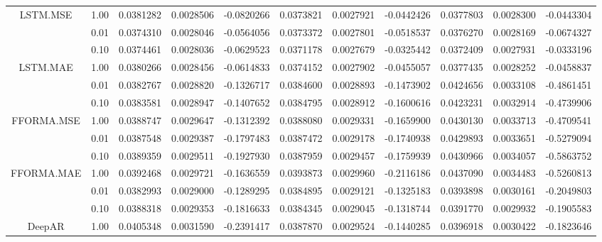 \begin{longtable}[t]{ccccccccccc}
\cmidrule{2-11}
\multirow{-3}{*}{\centering\arraybackslash LSTM.MSE} & 1.00 & 0.0381282 & 0.0028506 & -0.0820266 & 0.0373821 & 0.0027921 & -0.0442426 & 0.0377803 & 0.0028300 & -0.0443304\\
\cmidrule{1-11}
 & 0.01 & 0.0374310 & 0.0028046 & -0.0564056 & 0.0373372 & 0.0027801 & -0.0518537 & 0.0376270 & 0.0028169 & -0.0674327\\
\cmidrule{2-11}
 & 0.10 & 0.0374461 & 0.0028036 & -0.0629523 & 0.0371178 & 0.0027679 & -0.0325442 & 0.0372409 & 0.0027931 & -0.0333196\\
\cmidrule{2-11}
\multirow{-3}{*}{\centering\arraybackslash LSTM.MAE} & 1.00 & 0.0380266 & 0.0028456 & -0.0614833 & 0.0374152 & 0.0027902 & -0.0455057 & 0.0377435 & 0.0028252 & -0.0458837\\
\cmidrule{1-11}
 & 0.01 & 0.0382767 & 0.0028820 & -0.1326717 & 0.0384600 & 0.0028893 & -0.1473902 & 0.0424656 & 0.0033108 & -0.4861451\\
\cmidrule{2-11}
 & 0.10 & 0.0383581 & 0.0028947 & -0.1407652 & 0.0384795 & 0.0028912 & -0.1600616 & 0.0423231 & 0.0032914 & -0.4739906\\
\cmidrule{2-11}
\multirow{-3}{*}{\centering\arraybackslash FFORMA.MSE} & 1.00 & 0.0388747 & 0.0029647 & -0.1312392 & 0.0388080 & 0.0029331 & -0.1659900 & 0.0430130 & 0.0033713 & -0.4709541\\
\cmidrule{1-11}
 & 0.01 & 0.0387548 & 0.0029387 & -0.1797483 & 0.0387472 & 0.0029178 & -0.1740938 & 0.0429893 & 0.0033651 & -0.5279094\\
\cmidrule{2-11}
 & 0.10 & 0.0389359 & 0.0029511 & -0.1927930 & 0.0387959 & 0.0029457 & -0.1759939 & 0.0430966 & 0.0034057 & -0.5863752\\
\cmidrule{2-11}
\multirow{-3}{*}{\centering\arraybackslash FFORMA.MAE} & 1.00 & 0.0392468 & 0.0029721 & -0.1636559 & 0.0393873 & 0.0029960 & -0.2116186 & 0.0437090 & 0.0034483 & -0.5260813\\
\cmidrule{1-11}
 & 0.01 & 0.0382993 & 0.0029000 & -0.1289295 & 0.0384895 & 0.0029121 & -0.1325183 & 0.0393898 & 0.0030161 & -0.2049803\\
\cmidrule{2-11}
 & 0.10 & 0.0388318 & 0.0029353 & -0.1816633 & 0.0384345 & 0.0029045 & -0.1318744 & 0.0391770 & 0.0029932 & -0.1905583\\
\cmidrule{2-11}
\multirow{-3}{*}{\centering\arraybackslash DeepAR} & 1.00 & 0.0405348 & 0.0031590 & -0.2391417 & 0.0387870 & 0.0029524 & -0.1440285 & 0.0396918 & 0.0030422 & -0.1823646\\*
\end{longtable}
\endgroup{}